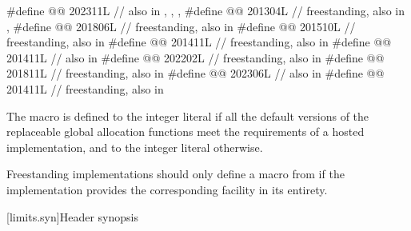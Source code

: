 \begin{codeblock}
#define @@                        202311L
  // also in , , , 
#define @@                    201304L // freestanding, also in , 
#define @@                     201806L // freestanding, also in 
#define @@     201510L // freestanding, also in 
#define @@               201411L // freestanding, also in 
#define @@         201411L // also in 
#define @@                       202202L // freestanding, also in 
#define @@                        201811L // freestanding, also in 
#define @@                           202306L // also in 
#define @@                            201411L // freestanding, also in 
\end{codeblock}

\pnum
The macro  is defined to
the integer literal 
if all the default versions of the replaceable global allocation functions meet
the requirements of a hosted implementation, and
to the integer literal  otherwise.

\pnum
\recommended
Freestanding implementations should only define a macro from 
if the implementation provides the corresponding facility in its entirety.

[limits.syn]{Header  synopsis}

%
%
%
%

